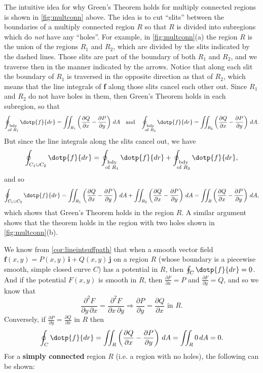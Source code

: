 The intuitive idea for why Green's Theorem holds for multiply connected regions is shown in \autoref{fig:multconn} above. The idea is to cut ``slits'' between the boundaries of a multiply connected region $R$ so that $R$ is divided into subregions which do \emph{not} have any ``holes''. For example, in \autoref{fig:multconn}(a) the region $R$ is the union of the regions $R_1$ and $R_2$, which are divided by the slits indicated by the dashed lines. Those slits are part of the boundary of both $R_1$ and $R_2$, and we traverse then in the manner indicated by the arrows. Notice that along each slit the boundary of $R_1$ is traversed in the opposite direction as that of $R_2$, which means that the line integrals of \textbf{f} along those slits cancel each other out. Since $R_1$ and $R_2$ do not have holes in them, then Green's Theorem holds in each subregion, so that
\[
 \oint_{\substack{\text{bdy}\\\text{of }R_1}}\dotp{f}{dr} = \iint_{R_1}
  \left( \frac{\partial Q}{\partial x} - \frac{\partial P}{\partial y} \right)\,dA \quad\text{and}\quad
 \oint_{\substack{\text{bdy}\\\text{of }R_2}}\dotp{f}{dr} = \iint_{R_2}
  \left( \frac{\partial Q}{\partial x} - \frac{\partial P}{\partial y} \right)\,dA .
\]
But since the line integrals along the slits cancel out, we have
\[
 \oint_{C_1 \cup C_2}\dotp{f}{dr} =
 \oint_{\substack{\text{bdy}\\\text{of }R_1}}\dotp{f}{dr} +
 \oint_{\substack{\text{bdy}\\\text{of }R_2}}\dotp{f}{dr} ,
\]
and so
\[
 \oint_{C_1 \cup C_2}\dotp{f}{dr} = \iint_{R_1}
  \left( \frac{\partial Q}{\partial x} - \frac{\partial P}{\partial y} \right)\,dA + \iint_{R_2}
  \left( \frac{\partial Q}{\partial x} - \frac{\partial P}{\partial y} \right)\,dA = \iint_{R}
  \left( \frac{\partial Q}{\partial x} - \frac{\partial P}{\partial y} \right)\,dA ,
\]
which shows that Green's Theorem holds in the region $R$. A similar argument shows that the theorem holds in the region with two holes shown in \autoref{fig:multconn}(b).

We know from \autoref{cor:lineintsuffpath} that when a smooth vector field $\textbf{f}(x,y) = P(x,y)\,\textbf{i} + Q(x,y)\,\textbf{j}$ on a region $R$ (whose boundary is a piecewise smooth, simple closed curve $C$) has a potential in $R$, then $\oint_{C}\dotp{f}{dr} = 0$. And if the potential $F(x,y)$ is smooth in $R$, then $\frac{\partial F}{\partial x} = P$ and $\frac{\partial F}{\partial y} = Q$, and so we know that
\[
 \frac{\partial^2 F}{\partial y \,\partial x} = \frac{\partial^2 F}{\partial x \,\partial y} \Rightarrow
 \frac{\partial P}{\partial y} = \frac{\partial Q}{\partial x} \text{ in $R$.}
\]
Conversely, if $\frac{\partial P}{\partial y} = \frac{\partial Q}{\partial x}$ in $R$ then
\[
 \oint_{C}\dotp{f}{dr} = \iint_{R} \left( \frac{\partial Q}{\partial x} -
   \frac{\partial P}{\partial y} \right)\,dA = \iint_{R} 0\,dA = 0 .
\]
For a \textbf{simply connected} region $R$ (i.e. a region with no holes), the following can be shown:

